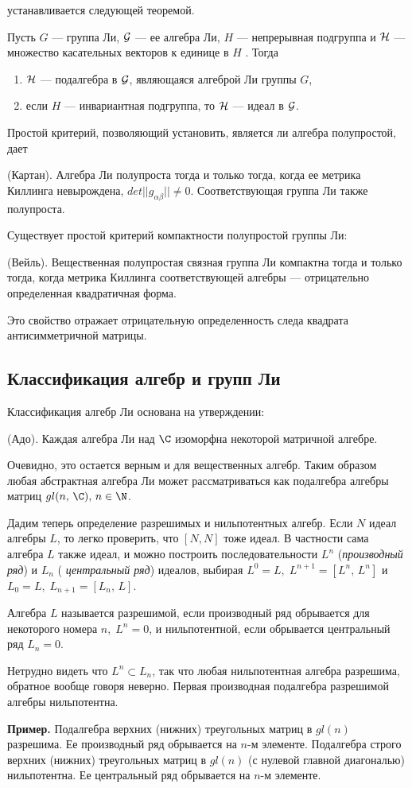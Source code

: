 \documentclass[a4paper
]{article}
\begin{document}
устанавливается следующей теоремой.
\begin{Trm}
Пусть $G$ --- группа Ли, ${\cal G}$ --- ее алгебра Ли, $H$ ---
непрерывная подгруппа и ${\cal H}$
--- множество касательных векторов к единице в $H$ . Тогда
\begin{enumerate}\item
${\cal H}$ --- подалгебра в ${\cal G}$, являющаяся алгеброй Ли
группы $G$, \item если  $H$ --- инвариантная подгруппа, то ${\cal
H}$ --- идеал в ${\cal G}$. \end{enumerate}
\end{Trm}
\noindent Простой критерий, позволяющий установить, является ли
алгебра полупростой, дает
\begin{Trm}
(Картан). Алгебра Ли полупроста тогда и только тогда, когда ее
метрика Киллинга невырождена, $det||g_{\alpha\beta}||\neq0$.
Соответствующая группа Ли также полупроста.
\end{Trm}
Существует простой критерий компактности полупростой группы Ли:
\begin{Trm} (Вейль).
Вещественная полупростая связная группа Ли компактна тогда и
только тогда, когда метрика Киллинга соответствующей алгебры
---  отрицательно определенная квадратичная форма.
\end{Trm}
Это свойство отражает отрицательную определенность следа квадрата
антисимметричной матрицы.
\subsection{Классификация  алгебр и групп Ли}
Классификация алгебр Ли  основана на утверждении:
\begin{Trm} (Адо). Каждая
алгебра Ли над $\C$ изоморфна некоторой матричной алгебре.
\end{Trm}
Очевидно, это остается верным и для вещественных алгебр. Таким
образом любая абстрактная алгебра Ли может рассматриваться как
подалгебра алгебры матриц $gl(n,\,\C),\,n\in\N$.

Дадим теперь определение разрешимых и нильпотентных алгебр. Если
$N$ идеал алгебры $L$, то легко проверить, что $[N,N]$ тоже идеал.
В частности сама алгебра $L$ также идеал, и можно построить
последовательности $L^n$ ({\em производный ряд}) и $L_n$ ({\em
центральный ряд}) идеалов, выбирая $L^0=L,\; L^{n+1}=[L^n,\,L^n]$
и $L_0=L,\; L_{n+1}=[L_n,\,L]$.
\begin{Def}
Алгебра $L $ называется разрешимой, если производный ряд
обрывается для некоторого номера $n, \;L^n=0$, и нильпотентной,
если обрывается центральный ряд $L_n=0$.
\end{Def}
\noindent Нетрудно видеть что $L^n \subset L_n$, так что любая
нильпотентная алгебра разрешима, обратное вообще говоря неверно.
Первая производная подалгебра разрешимой алгебры нильпотентна.
\par
{\bf Пример.} Подалгебра верхних (нижних) треугольных матриц в
$gl(n)$ разрешима. Ее производный ряд обрывается на  $n$-м
элементе. Подалгебра строго верхних (нижних) треугольных матриц в
$gl(n)$ (с нулевой главной диагональю) нильпотентна. Ее
центральный ряд обрывается на $n$-м элементе.
\end{document}
